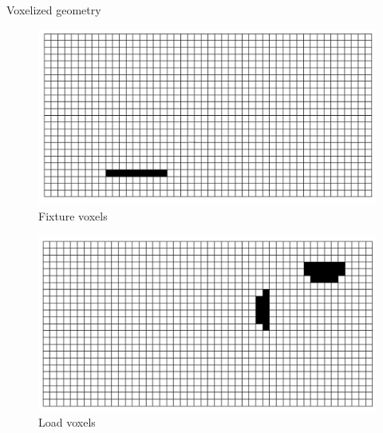 \begin{frame}{Voxelized geometry}
\begin{minipage}{0.49\textwidth}
\begin{figure}
\includegraphics[width=.7\textwidth]{Pictures/Voxels/Fixture.png}
\vspace*{-2mm}
\caption{Fixture voxels}
\end{figure}
\vspace{-0.6cm}
\begin{figure}
\includegraphics[width=.7\textwidth]{Pictures/Voxels/Load.png}
\vspace*{-2mm}
\caption{Load voxels}
\end{figure}
\end{minipage}
\end{frame}

